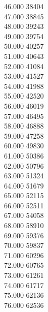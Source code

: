 { 46.000	38404 \\
 47.000	38845 \\
 48.000	39243 \\
 49.000	39754 \\
 50.000	40257 \\
 51.000	40643 \\
 52.000	41084 \\
 53.000	41527 \\
 54.000	41988 \\
 55.000	42520 \\
 56.000	46019 \\
 57.000	46495 \\
 58.000	46888 \\
 59.000	47258 \\
 60.000	49830 \\
 61.000	50386 \\
 62.000	50796 \\
 63.000	51324 \\
 64.000	51679 \\
 65.000	52115 \\
 66.000	52511 \\
 67.000	54058 \\
 68.000	58910 \\
 69.000	59376 \\
 70.000	59837 \\
 71.000	60296 \\
 72.000	60765 \\
 73.000	61261 \\
 74.000	61717 \\
 75.000	62136 \\
 76.000	62536 \\
}
